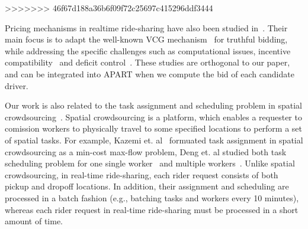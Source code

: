 >>>>>>> 46f67d188a36b6f09f72c25697c415296ddf3444

Pricing mechanisms in realtime ride-sharing have also been studied in~\cite{KamarIJCAI09,KleinerIJCAI11, ZhaoAAMAS14}. Their main focus is to adapt the well-known VCG mechanism~\cite{Nisan07} for truthful bidding, while addressing the specific challenges such as computational issues, incentive compatibility~\cite{KamarIJCAI09, KleinerIJCAI11} and deficit control~\cite{ZhaoAAMAS14}. These studies are orthogonal to our paper, and can be integrated into APART when we compute the bid of each candidate driver. 

Our work is also related to the task assignment and scheduling problem in spatial crowdsourcing~\cite{KazemiGis12, DengGis13, DengGis15}. Spatial crowdsourcing is a platform, which enables a requester to comission workers to physically travel to some specified locations to perform a set of spatial tasks. For example, Kazemi et. al~\cite{KazemiGis12} formuated task assignment in spatial crowdsourcing as a min-cost max-flow problem, Deng et. al studied both task scheduling problem for one single worker~\cite{DengGis13} and multiple workers~\cite{DengGis15}. Unlike spatial crowdsourcing, in real-time ride-sharing, each rider request consists of both pickup and dropoff locations. In addition, their assignment and scheduling are processed in a batch fashion (e.g., batching tasks and workers every 10 minutes), whereas each rider request in real-time ride-sharing must be processed in a short amount of time.
\vspace{-0.1in}